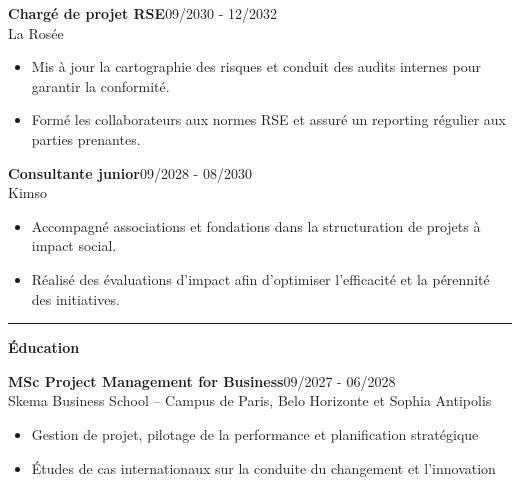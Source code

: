 \documentclass[a4paper]{article}
\renewcommand{\colorbox}[2]{#2}%
\newcommand{\fullrule}{\hspace{-1.5cm}\rule{\paperwidth}{0.4pt}}
\newcommand{\cvsection}[1]{%
  \vspace{6pt}\textbf{\Large #1}\par\vspace{2pt}}
\begin{document}
\vspace{3mm}

\colorbox{maincolor}{%
  \begin{minipage}{\linewidth}
    \noindent
    \textbf{Chargé de projet RSE}\hfill 09/2030 - 12/2032\\
    La Rosée\\[-0.3em]
    \begin{itemize}[leftmargin=*]
      \item Mis à jour la cartographie des risques et conduit des audits internes pour garantir la conformité. \item Formé les collaborateurs aux normes RSE et assuré un reporting régulier aux parties prenantes.
    \end{itemize}
  \end{minipage}}

\vspace{3mm}

\colorbox{maincolor}{%
  \begin{minipage}{\linewidth}
    \noindent
    \textbf{Consultante junior}\hfill 09/2028 - 08/2030\\
    Kimso\\[-0.3em]
    \begin{itemize}[leftmargin=*]
      \item Accompagné associations et fondations dans la structuration de projets à impact social. \item Réalisé des évaluations d’impact afin d’optimiser l’efficacité et la pérennité des initiatives.
    \end{itemize}
  \end{minipage}}

\medskip\fullrule

\cvsection{Éducation}
\vspace{0.3cm}

\colorbox{maincolor}{%
  \begin{minipage}{\linewidth}
    \noindent
    \textbf{MSc Project Management for Business}\hfill 09/2027 - 06/2028\\
    Skema Business School – Campus de Paris, Belo Horizonte et Sophia Antipolis\\[-0.3em]
    \begin{itemize}[leftmargin=*]
      \item Gestion de projet, pilotage de la performance et planification stratégique \item Études de cas internationaux sur la conduite du changement et l’innovation
    \end{itemize}
  \end{minipage}}
\end{document}
